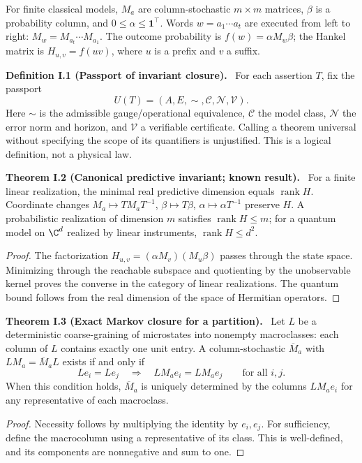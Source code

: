 \documentclass[11pt,a4paper,oneside]{book}
\newcommand{\one}{\mathbf 1}\newcommand{\ii}{\mathrm i}\newcommand{\dd}{\mathrm d}
\DeclareMathOperator{\rank}{rank}\DeclareMathOperator{\Tr}{Tr}
\newcommand{\statement}[3]{\par\medskip\noindent\textbf{#1 #2 (#3).}\ }
\begin{document}
For finite classical models, $M_a$ are column-stochastic $m\times m$ matrices, $\beta$ is a probability column, and $0\le\alpha\le\one^\top$. Words $w=a_1\cdots a_t$ are executed from left to right: $M_w=M_{a_t}\cdots M_{a_1}$. The outcome probability is $f(w)=\alpha M_w\beta$; the Hankel matrix is $H_{u,v}=f(uv)$, where $u$ is a prefix and $v$ a suffix.
\statement{Definition}{I.1}{Passport of invariant closure} For each assertion $T$, fix the passport
\[U(T)=(A,E,\sim,\mathcal C,\mathcal N,\mathcal V).\]
Here $\sim$ is the admissible gauge/operational equivalence, $\mathcal C$ the model class, $\mathcal N$ the error norm and horizon, and $\mathcal V$ a verifiable certificate. Calling a theorem universal without specifying the scope of its quantifiers is unjustified. This is a logical definition, not a physical law.
\statement{Theorem}{I.2}{Canonical predictive invariant; known result} For a finite linear realization, the minimal real predictive dimension equals $\rank H$. Coordinate changes $M_a\mapsto TM_aT^{-1}$, $\beta\mapsto T\beta$, $\alpha\mapsto\alpha T^{-1}$ preserve $H$. A probabilistic realization of dimension $m$ satisfies $\rank H\le m$; for a quantum model on $\C^d$ realized by linear instruments, $\rank H\le d^2$.
\begin{proof}The factorization $H_{u,v}=(\alpha M_v)(M_u\beta)$ passes through the state space. Minimizing through the reachable subspace and quotienting by the unobservable kernel proves the converse in the category of linear realizations. The quantum bound follows from the real dimension of the space of Hermitian operators.\end{proof}
\statement{Theorem}{I.3}{Exact Markov closure for a partition} Let $L$ be a deterministic coarse-graining of microstates into nonempty macroclasses: each column of $L$ contains exactly one unit entry. A column-stochastic $\overline M_a$ with $LM_a=\overline M_aL$ exists if and only if
\[Le_i=Le_j\quad\Longrightarrow\quad LM_ae_i=LM_ae_j\qquad\text{for all }i,j.\]
When this condition holds, $\overline M_a$ is uniquely determined by the columns $LM_ae_i$ for any representative of each macroclass.
\begin{proof}Necessity follows by multiplying the identity by $e_i,e_j$. For sufficiency, define the macrocolumn using a representative of its class. This is well-defined, and its components are nonnegative and sum to one.\end{proof}
\end{document}
